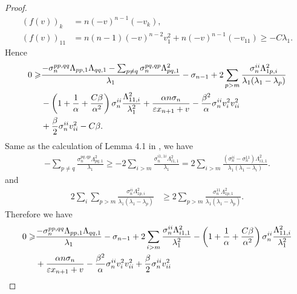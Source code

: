 \documentclass[reqno]{amsart}
\theoremstyle{remark}
\theoremstyle{definition}
\numberwithin{equation}{section}
\begin{document}
\begin{proof}
    \begin{align}
        \left( f(v) \right)_k &= n(-v)^{n-1}(-v_k), \\
        \left( f(v) \right)_{11} &= n(n-1)(-v)^{n-2}v_1^2 + n (-v)^{n-1}(-v_{11}) \geqslant -C\lambda_1.
    \end{align}
    Hence
    \begin{align}
        0 \geqslant& 
        \frac{-\sigma_n^{pp,qq} \Lambda_{pp,1}\Lambda_{qq,1} - \sum_{p \neq q} \sigma_n^{pq,qp} \Lambda_{pq,1}^2}{\lambda_1} 
        - \sigma_{n-1}
        + 2 \sum_{p > m} \frac{\sigma_n^{ii}\Lambda^2_{1p,i}}{\lambda_1(\lambda_1 - \lambda_p)} 
        \notag \\
        &- \left( 1+\frac{1}{\alpha}+\frac{C\beta}{\alpha^2} \right)\sigma_n^{ii} \frac{\Lambda_{11,i}^2}{\lambda_1^2} + \frac{\alpha n \sigma_n}{\varepsilon x_{n+1} + v} 
        - \frac{\beta^2}{\alpha} \sigma_n^{ii}v_{i}^2v_{ii}^2 
        \notag \\
        &+ \frac{\beta}{2} \sigma_n^{ii}v_{ii}^2 
        -C \beta.
    \end{align}
    Same as the calculation of Lemma 4.1 in \cite{lu2025interior}, we have
    \begin{align*}
        -\sum_{p \neq q} \frac{\sigma_n^{pq,qp}\Lambda_{pq,1}^2}{\lambda_1} \geqslant -2 \sum_{i>m} \frac{\sigma_n^{i1,1i} \Lambda_{i1,1}^2}{\lambda_1} = 2 \sum_{i>m} \frac{(\sigma_n^{ii} - \sigma_n^{11}) \Lambda_{i1,1}^2}{\lambda_1(\lambda_1 - \lambda_i)}. 
    \end{align*}
    and
    \begin{align*}
        2 \sum_{i} \sum_{p > m} \frac{\sigma_n^{ii} \Lambda^2_{1p,i}}{\lambda_1 \left( \lambda_1 - \lambda_p \right)} &\geqslant 2 \sum_{p > m} \frac{\sigma_n^{11} \Lambda^2_{1p,1}}{\lambda_1 \left( \lambda_1 - \lambda_p \right)}.
    \end{align*}
    Therefore we have
    \begin{align}\label{Gauss3}
        0 \geqslant& 
        \frac{-\sigma_n^{pp,qq} \Lambda_{pp,1}\Lambda_{qq,1}}{\lambda_1} 
        - \sigma_{n-1}
        + 2 \sum_{i > m} \frac{\sigma_n^{ii}\Lambda^2_{i1,1}}{\lambda_1^2} 
       - \left( 1+\frac{1}{\alpha}+\frac{C\beta}{\alpha^2} \right)\sigma_n^{ii} \frac{\Lambda_{11,i}^2}{\lambda_1^2}  \notag \\
        &+ \frac{\alpha n \sigma_n}{\varepsilon x_{n+1} + v} 
        - \frac{\beta^2}{\alpha} \sigma_n^{ii}v_{i}^2v_{ii}^2 
        + \frac{\beta}{2} \sigma_n^{ii}v_{ii}^2  

\end{align}
\end{proof}
\end{document}

